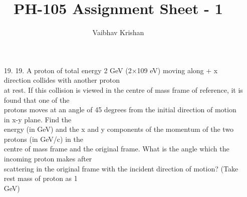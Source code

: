 \documentclass[10pt, a4paper]{article}
\begin{document}
\title{PH-105 Assignment Sheet - 1}
\author{Vaibhav Krishan}
\date{}
\maketitle
\begin{enumerate}
\item[19.]{19. A proton of total energy 2 GeV (2×109 eV) moving along + x direction collides with another proton\\
at rest. If this collision is viewed in the centre of mass frame of reference, it is found that one of the\\
protons moves at an angle of 45 degrees from the initial direction of motion in x-y plane. Find the\\
energy (in GeV) and the x and y components of the momentum of the two protons (in GeV/c) in the\\
centre of mass frame and the original frame. What is the angle which the incoming proton makes after\\
scattering in the original frame with the incident direction of motion? (Take rest mass of proton as 1\\
GeV)\\


}
\end{enumerate}
\end{document}
